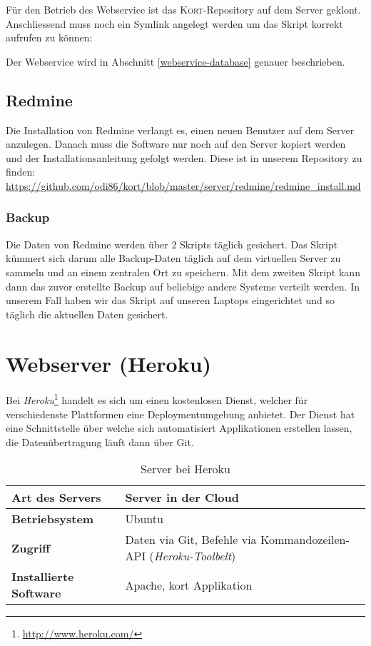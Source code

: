 Für den Betrieb des Webservice ist das \textsc{Kort}-Repository auf dem Server geklont.
Anschliessend muss noch ein Symlink angelegt werden um das Skript korrekt aufrufen zu können:


Der Webservice wird in Abschnitt \ref{webservice-database} genauer beschrieben.


\subsection{Redmine}
Die Installation von Redmine verlangt es, einen neuen Benutzer  auf dem Server anzulegen.
Danach muss die Software nur noch auf den Server kopiert werden und der Installationsanleitung gefolgt werden.
Diese ist in unserem Repository zu finden: \url{https://github.com/odi86/kort/blob/master/server/redmine/redmine_install.md}

\subsubsection{Backup}
Die Daten von Redmine werden über 2 Skripts täglich gesichert. 
Das Skript  kümmert sich darum alle Backup-Daten täglich auf dem virtuellen Server zu sammeln und an einem zentralen Ort zu speichern.
Mit dem zweiten Skript  kann dann das zuvor erstellte Backup auf beliebige andere Systeme verteilt werden.
In unserem Fall haben wir das Skript auf unseren Laptops eingerichtet und so täglich die aktuellen Daten gesichert.


\section{Webserver (Heroku)}

Bei \emph{Heroku}\footnote{\url{http://www.heroku.com/}} handelt es sich um einen kostenlosen Dienst, welcher für verschiedenste Plattformen eine Deploymentumgebung anbietet. 
Der Dienst hat eine Schnittstelle über welche sich automatisiert Applikationen erstellen lassen, die Datenübertragung läuft dann über \gls{Git}.

\begin{table}[H]
\centering
\begin{tabular}{|p{0.25\twocelltabwidth}|p{0.75\twocelltabwidth}|}
\hline 
\small{\textbf{Art des Servers}} & Server in der \gls{Cloud} \\
\hline 
\small{\textbf{Betriebsystem}} & Ubuntu \\
\hline 
\small{\textbf{Zugriff}} & Daten via \gls{Git}, Befehle via Kommandozeilen-\gls{API} (\emph{Heroku-Toolbelt}) \\
\hline 
\small{\textbf{Installierte Software}} & Apache, kort Applikation \\
\hline 
\end{tabular} 
\caption{Server bei Heroku}
\label{infrastruktur-heroku-tabelle}
\end{table}

